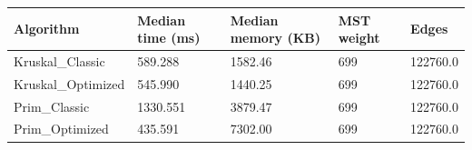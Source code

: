 \begin{tabular}{lllll}
\toprule
Algorithm & Median time (ms) & Median memory (KB) & MST weight & Edges \\
\midrule
Kruskal\_Classic & 589.288 & 1582.46 & 699 & 122760.0 \\
Kruskal\_Optimized & 545.990 & 1440.25 & 699 & 122760.0 \\
Prim\_Classic & 1330.551 & 3879.47 & 699 & 122760.0 \\
Prim\_Optimized & 435.591 & 7302.00 & 699 & 122760.0 \\
\bottomrule
\end{tabular}
